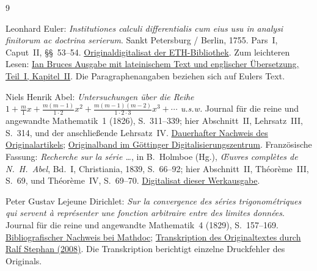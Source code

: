\begin{thebibliography}{9}
\small
\setlength{\itemsep}{.65em}

Leonhard Euler:
\emph{Institutiones calculi differentialis cum eius usu in
analysi finitorum ac doctrina serierum}.
Sankt Petersburg / Berlin, 1755.
Pars~I, Caput~II, \S\S~53--54.
\href{https://doi.org/10.3931/e-rara-3788}{Originaldigitalisat der ETH-Bibliothek}.
Zum leichteren Lesen:
\href{https://17centurymaths.com/contents/euler/diffcal/part1ch2.pdf}{Ian Bruces Ausgabe mit lateinischem Text und englischer Übersetzung, Teil~I, Kapitel~II}.
Die Paragraphenangaben beziehen sich auf Eulers Text.

Niels Henrik Abel:
\emph{Untersuchungen über die Reihe
$1+\frac m1x+\frac{m(m-1)}{1\cdot2}x^2+
\frac{m(m-1)(m-2)}{1\cdot2\cdot3}x^3+\cdots$ u.s.w.}
Journal für die reine und angewandte Mathematik~1 (1826),
S.~311--339; hier Abschnitt~II, Lehrsatz~III, S.~314,
und der anschließende Lehrsatz~IV.
\href{https://doi.org/10.1515/crll.1826.1.311}{Dauerhafter Nachweis des Originalartikels};
\href{https://gdz.sub.uni-goettingen.de/id/PPN243919689_0001}{Originalband im Göttinger Digitalisierungszentrum}.
Französische Fassung: \emph{Recherche sur la série \ldots},
in B.~Holmboe (Hg.), \emph{Œuvres complètes de N.~H.~Abel},
Bd.~I, Christiania, 1839, S.~66--92;
hier Abschnitt~II, Théorème~III, S.~69, und Théorème~IV, S.~69--70.
\href{https://www.hist-math.fr/textes/Abel1826_TheoremeBinomial.pdf}{Digitalisat dieser Werkausgabe}.

Peter Gustav Lejeune Dirichlet:
\emph{Sur la convergence des séries trigonométriques qui servent
à représenter une fonction arbitraire entre des limites données}.
Journal für die reine und angewandte Mathematik~4 (1829), S.~157--169.
\href{https://geodesic.mathdoc.fr/item/JRAM_1829__4_183134/}{Bibliografischer Nachweis bei Mathdoc};
\href{https://arxiv.org/abs/0806.1294}{Transkription des Originaltextes durch Ralf Stephan (2008)}.
Die Transkription berichtigt einzelne Druckfehler des Originals.

\end{thebibliography}
